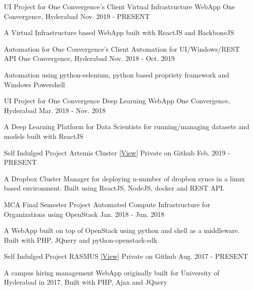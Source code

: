 \begin{cventries}
  \cventry
    {UI Project for One Convergence's Client}
    {Virtual Infrastructure WebApp}
    {One Convergence, Hyderabad}
    {Nov. 2019 - PRESENT}
    {
      \begin{cvitems}
        \item {A Virtual Infrastructure based WebApp built with ReactJS and BackboneJS}
      \end{cvitems}
    }
  \cventry
    {Automation for One Convergence's Client}
    {Automation for UI/Windows/REST API}
    {One Convergence, Hyderabad}
    {Nov. 2018 - Oct. 2019}
    {
      \begin{cvitems}
        \item {Automation using python-selenium, python based propriety framework and Windows Powershell}
      \end{cvitems}
    }
  \cventry
    {UI Project for One Convergence}
    {Deep Learning WebApp}
    {One Convergence, Hyderabad}
    {Mar. 2018 - Nov. 2018}
    {
      \begin{cvitems}
        \item {A Deep Learning Platform for Data Scientists for running/managing datasets and models built with ReactJS}
      \end{cvitems}
    }
  \cventry
    {Self Indulged Project}
    {Artemis Cluster \href{https://hdesign.in/portfolio\#portfolio/All?code=ARTEMIS}{\textmd{\color{awesome-skyblue} [View]}}}
    {Private on Github}
    {Feb. 2019 - PRESENT}
    {
      \begin{cvitems}
        \item {A Dropbox Cluster Manager for deploying n-number of dropbox syncs in a linux based environment. Built using ReactJS, NodeJS, docker and REST API.}
      \end{cvitems}
    }
  \cventry
    {MCA Final Semester Project}
    {Automated Compute Infrastructure for Organizations using OpenStack}
    {}
    {Jan. 2018 - Jun. 2018}
    {
      \begin{cvitems}
        \item {A WebApp built on top of OpenStack using python and shell as a middleware. Built with PHP, JQuery and python-openstack-sdk}
      \end{cvitems}
    }
  \cventry
    {Self Indulged Project}
    {RASMUS \href{https://hdesign.in/portfolio\#portfolio/All?code=RASMUS}{\textmd{\color{awesome-skyblue} [View]}}}
    {Private on Github}
    {Aug. 2017 - PRESENT}
    {
      \begin{cvitems}
        \item {A campus hiring management WebApp originally built for University of Hyderabad in 2017. Built with PHP, Ajax and JQuery}
      \end{cvitems}
    }
\end{cventries}
